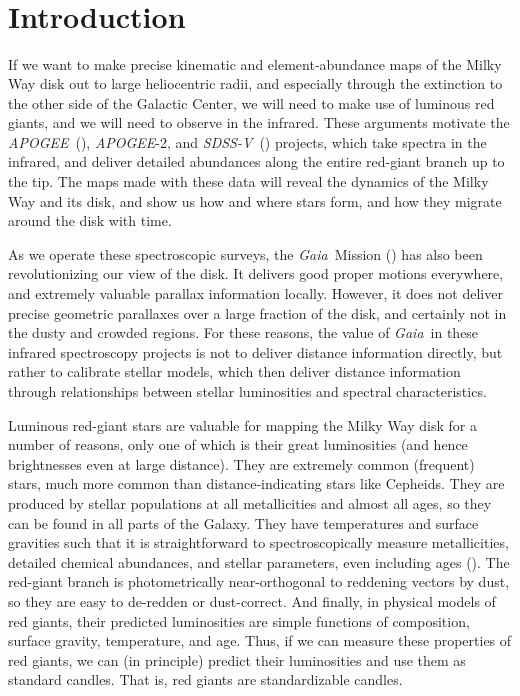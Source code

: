 \documentclass[modern]{aastex62}
\newcommand{\acronym}[1]{{\small{#1}}}
\newcommand{\project}[1]{\textsl{#1}}
\newcommand{\apogee}{\project{\acronym{APOGEE}}}
\newcommand{\gaia}{\project{Gaia}}
\newcommand{\sdssv}{\project{\acronym{SDSS-V}}}
\begin{document}

\section*{~}\clearpage
\section{Introduction} \label{sec:intro}

If we want to make precise kinematic and element-abundance maps
of the Milky Way disk out to large heliocentric radii,
and especially through the extinction to the other side of the Galactic Center, we will
need to make use of luminous red giants, and we will need to observe in
the infrared.
These arguments motivate the \apogee\ (\citealt{apogee}),
\apogee-2, and \sdssv\ (\citealt{sdssv})
projects, which take spectra in the infrared, and deliver detailed abundances
along the entire red-giant branch up to the tip.
The maps made with these data will reveal the dynamics of the Milky Way and its disk,
and show us how and where stars form, and how they migrate around the
disk with time.

As we operate these spectroscopic surveys,
the \gaia\ Mission (\citealt{gaia}) has also been revolutionizing our view of the disk.
It delivers good proper motions everywhere,
and extremely valuable parallax information locally.
However, it does not deliver precise geometric parallaxes over a large fraction of
the disk, and certainly not in the dusty and crowded regions.
For these reasons, the value of \gaia\ in these infrared spectroscopy projects is not
to deliver distance information directly, but rather to calibrate stellar models,
which then deliver distance information through relationships between stellar
luminosities and spectral characteristics.

Luminous red-giant stars are valuable for mapping the Milky Way disk for a number
of reasons, only one of which is their great luminosities (and hence brightnesses
even at large distance).
They are extremely common (frequent) stars, much more common than distance-indicating
stars like Cepheids.
They are produced by stellar populations at all metallicities and almost all ages,
so they can be found in all parts of the Galaxy.
They have temperatures and surface gravities such that it is
straightforward to spectroscopically measure metallicities,
detailed chemical abundances, and stellar parameters, even including ages (\citealt{martig, nessage}).
The red-giant branch is photometrically near-orthogonal to reddening vectors by dust,
so they are easy to de-redden or dust-correct.
And finally, in physical models of red giants, their predicted luminosities are simple
functions of composition, surface gravity, temperature, and age.
Thus, if we can measure these properties of red giants, we can (in principle) predict
their luminosities and use them as standard candles.
That is, red giants are standardizable candles.
\end{document}
